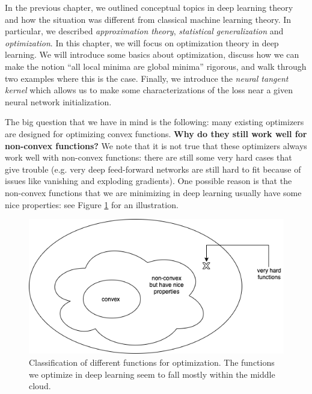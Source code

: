 \setcounter{section}{0}


In the previous chapter, we outlined conceptual topics in deep learning theory and how the situation was different from classical machine learning theory. In particular, we described \textit{approximation theory}, \textit{statistical generalization} and \textit{optimization}. In this chapter, we will focus on optimization theory in deep learning. We will introduce some basics about optimization, discuss how we can make the notion ``all local minima are global minima'' rigorous, and walk through two examples where this is the case. Finally, we introduce the \textit{neural tangent kernel} which allows us to make some characterizations of the loss near a given neural network initialization.


The big question that we have in mind is the following: many existing optimizers are designed for optimizing convex functions. \textbf{Why do they still work well for non-convex functions?} We note that it is not true that these optimizers always work well with non-convex functions: there are still some very hard cases that give trouble (e.g. very deep feed-forward networks are still hard to fit because of issues like vanishing and exploding gradients). One possible reason is that the non-convex functions that we are minimizing in deep learning usually have some nice properties: see Figure \ref{lec10:fig:optimization} for an illustration.

\begin{figure}[ht!]
    \centering
    \includegraphics[scale = 0.5]{figures/landscape.png}
    \caption{Classification of different functions for optimization. The functions we optimize in deep learning seem to fall mostly within the middle cloud.}
    \label{lec10:fig:optimization}
\end{figure}

